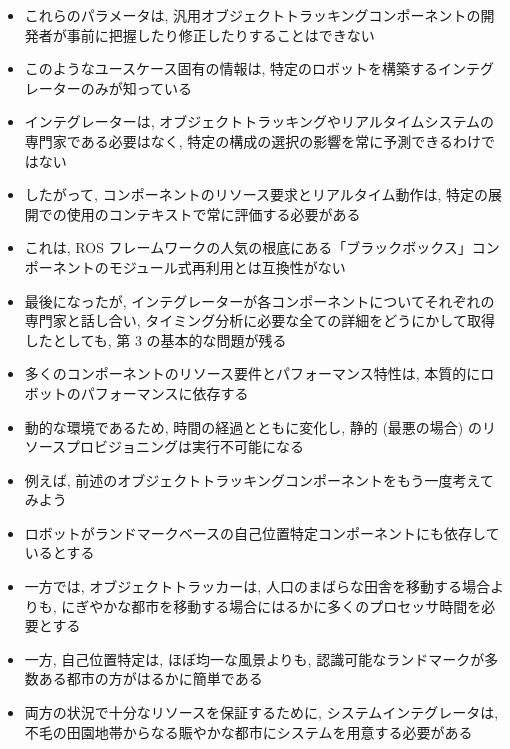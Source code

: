 \begin{frame}{}
    \begin{itemize}
        \item これらのパラメータは, 汎用オブジェクトトラッキングコンポーネントの開発者が事前に把握したり修正したりすることはできない
        \item このようなユースケース固有の情報は, 特定のロボットを構築するインテグレーターのみが知っている
        \item インテグレーターは, オブジェクトトラッキングやリアルタイムシステムの専門家である必要はなく, 特定の構成の選択の影響を常に予測できるわけではない
        \item したがって, コンポーネントのリソース要求とリアルタイム動作は, 特定の展開での使用のコンテキストで常に評価する必要がある
        \item これは, ROS フレームワークの人気の根底にある「ブラックボックス」コンポーネントのモジュール式再利用とは互換性がない
    \end{itemize}
\end{frame}

\begin{frame}{}
    \begin{itemize}
        \item 最後になったが, インテグレーターが各コンポーネントについてそれぞれの専門家と話し合い, タイミング分析に必要な全ての詳細をどうにかして取得したとしても, 第 3 の基本的な問題が残る
        \item 多くのコンポーネントのリソース要件とパフォーマンス特性は, 本質的にロボットのパフォーマンスに依存する
        \item 動的な環境であるため, 時間の経過とともに変化し, 静的 (最悪の場合) のリソースプロビジョニングは実行不可能になる
    \end{itemize}
\end{frame}

\begin{frame}{}
    \begin{itemize}
        \item 例えば, 前述のオブジェクトトラッキングコンポーネントをもう一度考えてみよう
        \item ロボットがランドマークベースの自己位置特定コンポーネントにも依存しているとする
        \item 一方では, オブジェクトトラッカーは, 人口のまばらな田舎を移動する場合よりも, にぎやかな都市を移動する場合にはるかに多くのプロセッサ時間を必要とする
        \item 一方, 自己位置特定は, ほぼ均一な風景よりも, 認識可能なランドマークが多数ある都市の方がはるかに簡単である
        \item 両方の状況で十分なリソースを保証するために, システムインテグレータは, 不毛の田園地帯からなる賑やかな都市にシステムを用意する必要がある
    \end{itemize}
\end{frame}

